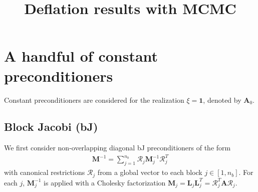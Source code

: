 \documentclass{article}
\title{Deflation results with MCMC}
\begin{document}
\maketitle

\section{A handful of constant preconditioners}
Constant preconditioners are considered for the realization $\xi=\mathbf{1}$, denoted by $\mathbf{A}_0$.
\subsection{Block Jacobi (bJ)}
We first consider non-overlapping diagonal bJ preconditioners of the form
\begin{align}
\mathbf{M}^{-1}=\sum_{j=1}^{n_b}\boldsymbol{\mathcal{R}}_j\mathbf{M}_j^{-1}\boldsymbol{\mathcal{R}}_j^T
\end{align}
with canonical restrictions $\boldsymbol{\mathcal{R}}_j$ from a global vector to each block $j\in[1,n_b]$.
For each $j$, $\mathbf{M}_j^{-1}$ is applied with a Cholesky factorization $\mathbf{M}_j=\mathbf{L}_j\mathbf{L}_j^T=\boldsymbol{\mathcal{R}}_j^T\mathbf{A}\boldsymbol{\mathcal{R}}_j$.
\end{document}
